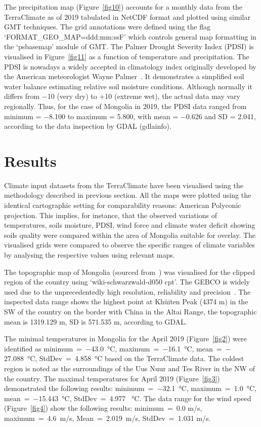 \documentclass[geosciences,article,accept,pdftex,oneauthor]{Definitions/mdpi}
\begin{document}
The precipitation map (Figure~\ref{fig10}) accounts for a monthly data from the TerraClimate as of 2019 tabulated in NetCDF format and plotted using similar GMT techniques. The grid annotations were defined using the flag ‘FORMAT\_GEO\_MAP=ddd:mm:ssF' which controls general map formatting in the ‘psbasemap’ module of GMT. The Palmer Drought Severity Index (PDSI) is visualised in Figure~\ref{fig11} as a function of temperature and precipitation. The PDSI is nowadays a widely accepted in climatology index originally developed by the American meteorologist Wayne Palmer~\cite{Palmer1965}. It demonstrates a simplified soil water balance estimating relative soil moisture conditions. Although normally it differs from $-$10 (very dry) to +10 (extreme wet), the actual data may vary regionally. Thus, for the case of Mongolia in 2019, the PDSI data ranged from minimum = $-$8.100 to maximum = 5.800, with mean = $-$0.626 and SD = 2.041, according to the data inspection by GDAL (gdlainfo). 

\section{Results}

Climate input datasets from the TerraClimate have been visualised using the methodology described in previous section. All the maps were plotted using the identical cartographic setting for comparability reasons: American Polyconic projection. This implies, for instance, that the observed variations of temperatures, soils moisture, PDSI, wind force and climate water deficit showing soils quality were compared within the area of Mongolia suitable for overlay. The visualised grids were compared to observe the specific ranges of climate variables by analysing the respective values using relevant maps.

The topographic map of Mongolia (sourced from~\cite{GEBCO}) was visualised for the clipped region of the country using ‘wiki-schwarzwald-d050 cpt’. The GEBCO is widely used due to the unprecedentedly high resolution, reliability and precision~\cite{Liuetal2019,Nock,Lemenkova2020m,Saito}. The inspected data range shows the highest point at Khüiten Peak (4374 m) in the SW of the country on the border with China in the Altai Range, the topographic mean is 1319.129 m, SD is 571.535 m, according to GDAL. 

The minimal temperatures in Mongolia for the April 2019 (Figure~\ref{fig2}) were identified as minimum~=~$-$43.0~°C, maximum~=~$-$16.1~°C, mean~=~$-$27.088~°C, StdDev~=~4.858~°C based on the TerraClimate data. The coldest region is noted as the surroundings of the Uus Nuur and Tes River in the NW of the country. The maximal temperatures for April 2019 (Figure~\ref{fig3}) demonstrated the following results: minimum~=~$-$32.1~°C, maximum~=~1.0~°C, mean~=~$-$15.443~°C, StdDev~=~4.977 ~°C. The data range for the wind speed (Figure~\ref{fig4}) show the following results: minimum~=~0.0 m/s, maximum~=~4.6~m/s, Mean~=~2.019~m/s, StdDev~=~1.031 m/s. 
\end{document}
